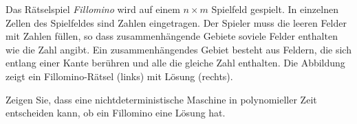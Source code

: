 Das Rätselspiel {\it Fillomino} wird auf einem $n\times m$ Spielfeld 
gespielt. In einzelnen Zellen des Spielfeldes sind Zahlen eingetragen.
Der Spieler muss die leeren Felder mit Zahlen füllen, so dass
zusammenhängende Gebiete soviele Felder enthalten
wie die Zahl angibt. Ein zusammenhängendes Gebiet besteht aus Feldern,
die sich entlang einer Kante berühren und alle die gleiche Zahl enthalten.
Die Abbildung zeigt ein Fillomino-Rätsel (links) mit Lösung (rechts).
\begin{center}
\qquad
{}
\end{center}
Zeigen Sie, dass eine nichtdeterministische Maschine in polynomieller
Zeit entscheiden kann, ob ein Fillomino eine Lösung hat.


